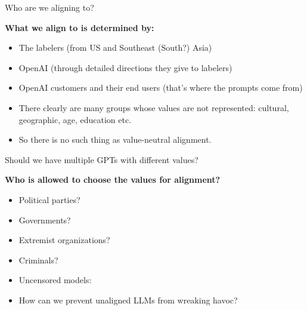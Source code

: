 \begin{vbframe}{Who are we aligning to?}

\vfill

\textbf{What we align to is determined by:}

	\begin{itemize}
		\item The labelers (from US and Southeast
		(South?) Asia)
		\item OpenAI (through detailed directions
		they give to labelers)
		\item OpenAI customers and their end users
		(that's where the prompts come from)
                \item There clearly are many groups whose
		values are not represented: cultural,
		geographic, age, education etc.
                \item So there is no such thing as
		value-neutral alignment.
	\end{itemize}

\vfill

\end{vbframe}

\begin{vbframe}{Should we have multiple GPTs with different values?}

\vfill

\textbf{Who is allowed to choose the values for alignment?}

	\begin{itemize}
		\item Political parties?
		\item Governments?
		\item Extremist organizations?
                \item Criminals?
                \item Uncensored models:
                \href{https://erichartford.com}{}
                \item \ques How can we prevent unaligned
		LLMs from wreaking havoc?
	\end{itemize}

\vfill

\end{vbframe}




